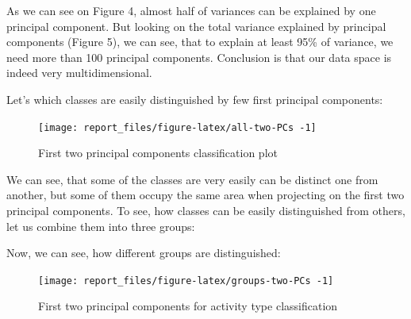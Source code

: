 \documentclass[
]{article}
\newenvironment{Shaded}{\begin{snugshade}}{\end{snugshade}}
\newcommand{\CommentTok}[1]{\textcolor[rgb]{0.56,0.35,0.01}{\textit{#1}}}
\newcommand{\FunctionTok}[1]{\textcolor[rgb]{0.00,0.00,0.00}{#1}}
\newcommand{\NormalTok}[1]{#1}
\newcommand{\OtherTok}[1]{\textcolor[rgb]{0.56,0.35,0.01}{#1}}
\newcommand{\SpecialCharTok}[1]{\textcolor[rgb]{0.00,0.00,0.00}{#1}}
\newcommand{\StringTok}[1]{\textcolor[rgb]{0.31,0.60,0.02}{#1}}
\begin{document}
As we can see on Figure 4, almost half of variances can be explained by
one principal component. But looking on the total variance explained by
principal components (Figure 5), we can see, that to explain at least
95\% of variance, we need more than 100 principal components. Conclusion
is that our data space is indeed very multidimensional.

Let's which classes are easily distinguished by few first principal
components:

\begin{figure}

{\centering \texttt{[image: report\_files/figure-latex/all-two-PCs -1]} 

}

\caption{First two principal components classification plot}\label{fig:all-two-PCs }
\end{figure}

We can see, that some of the classes are very easily can be distinct one
from another, but some of them occupy the same area when projecting on
the first two principal components. To see, how classes can be easily
distinguished from others, let us combine them into three groups:

\begin{Shaded}
\end{Shaded}

Now, we can see, how different groups are distinguished:

\begin{figure}

{\centering \texttt{[image: report\_files/figure-latex/groups-two-PCs -1]} 

}

\caption{First two principal components for activity type classification}\label{fig:groups-two-PCs }
\end{figure}
\end{document}
